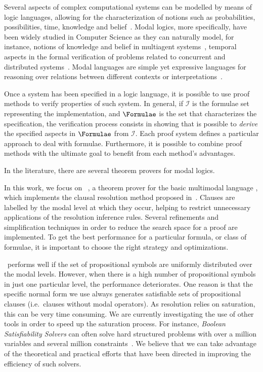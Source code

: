 Several aspects of complex computational systems can be modelled by means of
logic languages, allowing for the characterization of notions such as
probabilities, possibilities, time, knowledge and
belief~\cite{FHMV95,HMM83,Hai82,rao:91c}. Modal logics, more specifically, have
been widely studied in Computer Science as they can naturally model, for
instance, notions of knowledge and belief in multiagent
systems~\cite{bratman1987intention,FHMV95,rao:91c}, temporal aspects in the
formal verification of problems related to concurrent and distributed
systems~\cite{HMM83,Hai82}. Modal languages are simple yet expressive languages
for reasoning over relations between different contexts or
interpretations~\cite{blackburn2002modal}.

Once a system has been specified in a logic language, it is possible to use
proof methods to verify properties of such system. In general, if $\mathcal{I}$
is the formulae set representing the implementation, and $\Formulae$ is the set
that characterizes the specification, the verification process consists in
showing that is possible to \emph{derive} the specified aspects in $\Formulae$
from $\mathcal{I}$. Each proof system defines a particular approach to deal with
formulae. Furthermore, it is possible to combine proof methods with
the ultimate goal to benefit from each method's advantages. 

In the literature, there are several theorem provers for modal logics. 

In this work, we focus on \ksp~\cite{Nalon2016}, a theorem prover for the basic
multimodal language , which implements the clausal resolution
method proposed in~\cite{nalon2015modal}. Clauses are labelled by the modal
level at which they occur, helping to restrict unnecessary applications of the
resolution inference rules. Several refinements and simplification techniques in
order to reduce the search space for a proof are implemented. To get the best
performance for a particular formula, or class of formulae, it is important to
choose the right strategy and optimizations. 

\ksp~performs well if the set of propositional symbols are uniformly distributed
over the modal levels. However, when there is a high number of propositional
symbols in just one particular level, the performance deteriorates. One reason
is that the specific normal form we use always generates satisfiable sets of
propositional clauses (i.e.\ clauses without modal operators). As resolution
relies on saturation, this can be very time consuming. We are currently
investigating the use of other tools in order to speed up the saturation
process. For instance, \emph{Boolean Satisfiability Solvers} can often solve
hard structured problems with over a million variables and several million
constraints~\cite{satchapter}. We believe that we can take advantage of the
theoretical and practical efforts that have been directed in improving the
efficiency of such solvers. 


